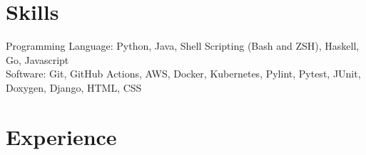 \documentclass[11pt,letterpaper,sans]{moderncv}        %
\begin{document}



\vspace{-2.0em}
\section{Skills}
\begin{small}
Programming Language: Python, Java, Shell Scripting (Bash and ZSH), Haskell, Go, Javascript \\
Software: Git, GitHub Actions, AWS, Docker, Kubernetes, Pylint, Pytest, JUnit, Doxygen, Django, HTML, CSS
\end{small}


\vspace{-1.0em}
\section{Experience}
\end{document}
